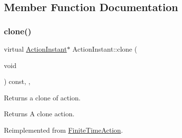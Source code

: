 \subsection{Member Function Documentation}
\mbox{\label{classActionInstant_adb76fc6f006098109e8256210cbd8cc0}} 
\subsubsection{\texorpdfstring{clone()}{clone()}\hspace{0.1cm}{\footnotesize\ttfamily [1/2]}}
{\footnotesize\ttfamily virtual \hyperlink{classActionInstant}{Action\+Instant}$\ast$ Action\+Instant\+::clone (\begin{DoxyParamCaption}\item[{void}]{ }\end{DoxyParamCaption}) const\hspace{0.3cm}{\ttfamily [inline]}, {\ttfamily [override]}, {\ttfamily [virtual]}}

Returns a clone of action.

\begin{DoxyReturn}{Returns}
A clone action. 
\end{DoxyReturn}


Reimplemented from \hyperlink{classFiniteTimeAction_a44813fca4fdf22f367a4657147dd150b}{Finite\+Time\+Action}.



